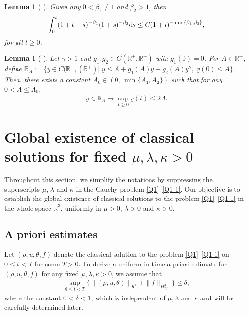 \documentclass[reqno,11pt]{amsart}
\theoremstyle{plain}
\newtheorem{lem}[thm]{Lemma}
\numberwithin{equation}{section}
\begin{document}
\begin{lem} [{\!\! \cite[Lemma 3.2]{CDM-krm-2011}}]\label{LA.3}   
Given any $0<\beta_1\ne 1$ and $\beta_2>1$, then
\begin{align*}
\int_0^t (1+t-s)^{-\beta_1}(1+s)^{-\beta_2} {\rm d}s \leq C(1+t)^{-\min\{\beta_1,\beta_2\}}, 
\end{align*}
for all $t\geq 0$.
\end{lem} 

\begin{lem} [{\!\! \cite[Lemma 3.3]{CDM-krm-2011}}]\label{LA.4}   
Let $\gamma>1$ and $g_1,g_2\in C( \mathbb{R}^+, \mathbb{R}^+)$ with
$g_1(0)=0$. For $A\in  \mathbb{R}^+$, define $ \mathds{B}_{A}:=\{y\in C( \mathbb{R}^+,( \mathbb{R}^+)|\, \,y\leq A+g_1(A)y+g_2(A)y^{\gamma},\,\, y(0)\leq A\}$.
Then, there exists a constant $A_0\in (0,\,\min\{A_1,A_2\})$ such that for
any $0<A\leq A_0$, 
\begin{align*}
y\in \mathds{B}_A \Rightarrow \sup_{t\geq 0}y(t)\leq 2A.
\end{align*}
\end{lem} 
 




 


\section{Global existence of classical solutions  for  fixed  {\(\mu,\lambda, \kappa>0\)} }
Throughout this  section, we simplify the notations by suppressing the superscripts $\mu$, $\lambda$ and $\kappa$ in the Cauchy problem \eqref{Q1}--\eqref{Q1-1}. Our objective is to establish the global existence of classical solutions to the  problem \eqref{Q1}--\eqref{Q1-1} in the whole space $\mathbb{R}^3$, uniformly in $\mu>0$, $\lambda>0$ and $\kappa>0$.

\subsection{A priori estimates}  
Let $(\rho, u, \theta, f)$ denote the classical solution to the problem \eqref{Q1}--\eqref{Q1-1} on $0 \leq t < T$ for some $T > 0$.
To derive a uniform-in-time a priori estimate for $(\rho, u, \theta, f)$ for any fixed \(\mu,\lambda, \kappa>0\), we assume that  
\begin{align}\label{G3.1}  
\sup_{0 \leq t < T} \big\{\|(\rho,u,\theta)\|_{H^4} + \|f\|_{H^4_{x,v}} \big\} \leq \delta,  
\end{align}  
where the constant $0 < \delta < 1$, which is independent of $\mu,\lambda$ and $\kappa$ and will be carefully determined later.  
 
\end{document}
